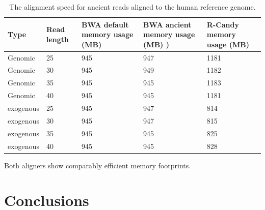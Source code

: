 \documentclass[11pt,a4paper]{report}
\begin{document}
\begin{table}[H]
  \begin{tabular}{ |  p{2cm} | p{2cm} | p{2cm} | p{2cm} |p{2cm} | }
    \hline
  	\textbf{Type} & \textbf{Read length }&\textbf{ BWA  
  		default memory usage (MB) }
  	&\textbf{ BWA ancient memory usage (MB) )} 
  	& \textbf{R-Candy memory usage (MB) }\\ \hline
 	  Genomic    & 25  & 945 &  947   &  1181 \\ \hline
      Genomic    & 30  & 945 &  949  &  1182 \\ \hline
      Genomic    & 35  & 945 &  945   &  1183 \\ \hline
 	  Genomic	 & 40  & 945 &  945   &  1181 \\ \hline
 	  exogenous  & 25  & 945 &  947   &  814 \\ \hline
      exogenous  & 30  & 945 &  947   &  815 \\ \hline
 	  exogenous  & 35  & 945 &  945   &  825 \\ \hline
 	  exogenous  & 40  & 945 &  945   &  828 \\ \hline
   \end{tabular}
\caption{The alignment speed for ancient reads aligned to 
the human reference genome.}
\label{speed-RG}
\end{table}

Both aligners show comparably efficient memory footprints.






\section{Conclusions} \label{Conclusions}
\end{document}
